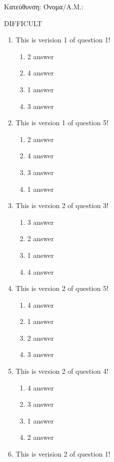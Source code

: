 \documentclass[a4paper, 11pt]{article}
\begin{document}
{\flushleft Κατεύθυνση: }
{\flushleft Όνομα/Α.Μ.: }
\vspace*{0.5cm}
\begin{center} {\Large  DIFFICULT } \end{center}
\begin{enumerate}
\item This is verision 1 of question 1!
\begin{enumerate}[(1)]
    \item 2 answer
    \item 4 answer
    \item 1 answer
    \item 3 answer
\end{enumerate}
\item This is version 1 of question 5!
\begin{enumerate}[(1)]
    \item 2 answer
    \item 4 answer
    \item 3 answer
    \item 1 answer
\end{enumerate}
\item This is version 2 of question 3!
\begin{enumerate}[(1)]
    \item 3 answer
    \item 2 answer
    \item 1 answer
    \item 4 answer
\end{enumerate}
\item This is version 2 of question 5!
\begin{enumerate}[(1)]
    \item 4 answer
    \item 1 answer
    \item 2 answer
    \item 3 answer
\end{enumerate}
\item This is version 2 of question 4!
\begin{enumerate}[(1)]
    \item 4 answer
    \item 3 answer
    \item 1 answer
    \item 2 answer
\end{enumerate}
\item This is verision 2 of question 1!
\begin{enumerate}[(1)]

\end{enumerate}
\end{enumerate}
\end{document}
